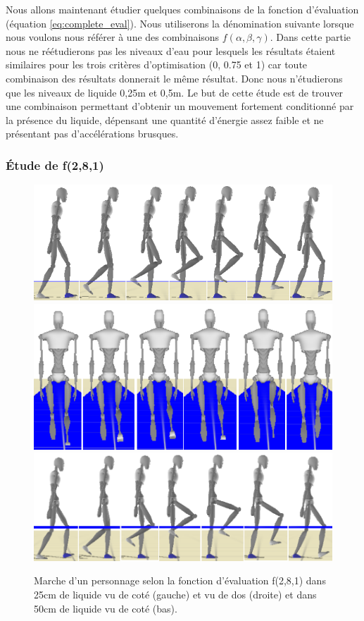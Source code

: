 \documentclass[runningheads,a4paper]{llncs}
\begin{document}
\vspace*{0.5cm}
Nous allons maintenant étudier quelques combinaisons de la fonction d'évaluation (équation \ref{eq:complete_eval}). Nous utiliserons la dénomination suivante lorsque nous voulons nous référer à une des combinaisons $f(\alpha,\beta,\gamma)$. Dans cette partie nous ne réétudierons pas les niveaux d'eau pour lesquels les résultats étaient similaires pour les trois critères d'optimisation (0, 0.75 et 1) car toute combinaison des résultats donnerait le même résultat. Donc nous n'étudierons que les niveaux de liquide 0,25m et 0,5m. Le but de cette étude est de trouver une combinaison permettant d'obtenir un mouvement fortement conditionné par la présence du liquide, dépensant une quantité d'énergie assez faible et ne présentant pas d'accélérations brusques. 

\subsubsection{Étude de f(2,8,1)}

\vspace*{-0.9cm}
\begin{figure}[h]
\centering
\includegraphics[scale=0.35]{strips/2_8_1_25cm.png}
\includegraphics[scale=0.35]{strips/2_8_1_25cm_from_back.png}
\includegraphics[scale=0.4]{strips/2_8_1_50cm.png}
\caption{Marche d'un personnage selon la fonction d'évaluation f(2,8,1) dans 25cm de liquide vu de coté (gauche) et vu de dos (droite) et dans 50cm de liquide vu de coté (bas). }
\label{fig:f281}
\end{figure}
\end{document}
